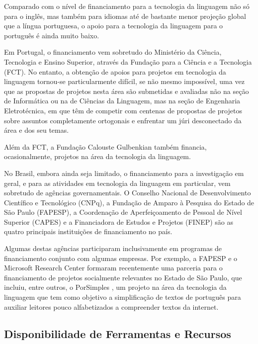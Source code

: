 \begin{multicols}{2}
Comparado com o nível de financiamento para a tecnologia da linguagem
não só para o inglês, mas também para idiomas até de bastante menor projeção global 
que a língua portuguesa, o apoio para a tecnologia da linguagem para o português 
é ainda muito baixo.

Em Portugal, o financiamento vem sobretudo do Ministério da Ciência, 
Tecnologia e Ensino Superior, através da Fundação para a Ciência e a Tecnologia (FCT). 
No entanto, a obtenção de apoios para projetos em tecnologia da linguagem tornou-se particularmente difícil,
se não mesmo impossível, uma vez que as propostas de projetos nesta área são submetidas 
e avaliadas não na seção de Informática ou na de Ciências da Linguagem, mas na seção de Engenharia Eletrotécnica, 
em que têm de competir com centenas de propostas de projetos sobre assuntos completamente ortogonais
e enfrentar um júri desconectado da área e dos seu temas.

Além da FCT, a Fundação Calouste Gulbenkian também financia, ocasionalmente, projetos na área 
da tecnologia da linguagem.



No Brasil, embora ainda seja limitado, o financiamento para a investigação em geral, e para as atividades em tecnologia da linguagem em particular, vem sobretudo de agências governamentais. 
O Conselho Nacional de Desenvolvimento Científico e Tecnológico (CNPq), 
a Fundação de Amparo à Pesquisa do Estado de São Paulo (FAPESP), 
a Coordenação de Aperfeiçoamento de Pessoal de Nível Superior (CAPES) 
e a Financiadora de Estudos e Projetos (FINEP) são as quatro principais instituições de financiamento no país. 

Algumas destas agências participaram inclusivamente em programas de financiamento conjunto com algumas empresas. 
Por exemplo, a FAPESP e o Microsoft Research Center formaram recentemente uma parceria para o financiamento de projetos 
socialmente relevantes no Estado de São Paulo, que incluiu, entre outros, o PorSimples \cite{porsimples}, 
um projeto na área da tecnologia da linguagem que tem como objetivo a simplificação de textos de português para auxiliar leitores pouco alfabetizados a compreender textos da internet.


\subsection{Disponibilidade de Ferramentas e Recursos}



\end{multicols}
